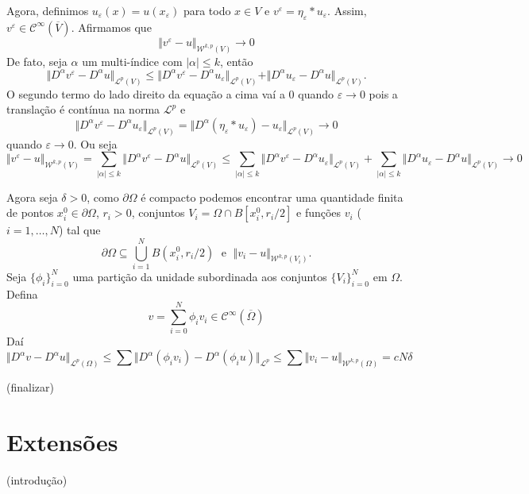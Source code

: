 \documentclass[a4paper, 11pt]{book}
\theoremstyle{definition}
\newcommand{\cC}{\mathcal{C}}
\newcommand{\cL}{\mathcal{L}}
\newcommand{\cW}{\mathcal{W}}
\begin{document}
\begin{prf}
    Agora, definimos $u_\varepsilon(x) = u(x_\varepsilon)$ para todo $x \in V$ e $v^\varepsilon = \eta_\varepsilon * u_\varepsilon$. Assim, $v^\varepsilon \in \cC^{\infty}(\overline V)$.
    Afirmamos que
    \[
        \Vert v^\varepsilon - u \Vert_{\cW^{k,p}(V)} \to 0
    \]
    De fato, seja $\alpha $ um multi-índice com $|\alpha| \leqslant k$, então
    \[
        \Vert D^\alpha v^\varepsilon - D^\alpha u \Vert_{\cL^p(V)} \leqslant \Vert D^\alpha v^\varepsilon - D^\alpha u_\varepsilon \Vert_{\cL^p(V)} + \Vert D^\alpha u_\varepsilon - D^\alpha u \Vert_{\cL^p(V)}.
    \]
    O segundo termo do lado direito da equação a cima vaí a $0$ quando $\varepsilon \to 0$ pois a translação é contínua na norma $\cL^p$ e
    \[
        \Vert D^\alpha v^\varepsilon - D^\alpha u_\varepsilon \Vert_{\cL^p(V)} = \Vert D^\alpha (\eta_\varepsilon * u_\varepsilon) - u_\varepsilon \Vert_{\cL^p(V)} \to 0
    \]
    quando $\varepsilon \to 0$. Ou seja
    \[
        \Vert v^\varepsilon - u \Vert_{\cW^{k,p}(V)} = \sum_{|\alpha| \leqslant k} \Vert D^\alpha v^\varepsilon - D^\alpha u \Vert_{\cL^p(V)} \leqslant \sum_{|\alpha| \leqslant k} \Vert D^\alpha v^\varepsilon - D^\alpha u_\varepsilon \Vert_{\cL^p(V)} + \sum_{|\alpha| \leqslant k} \Vert D^\alpha u_\varepsilon - D^\alpha u \Vert_{\cL^p(V)} \to 0
    \]

    Agora seja $\delta > 0$, como $\partial \Omega$ é compacto podemos encontrar uma quantidade finita de pontos $x^0_i \in \partial \Omega$, $r_i > 0$, conjuntos $V_i = \Omega \cap B[x^0_i,r_i / 2]$ e funções $v_i$ ($i = 1,\dots, N$) tal que
    \[
        \partial\Omega \subseteq \bigcup_{i=1}^N B(x_i^0, r_i/2) \;\text{ e }\; \Vert v_i - u \Vert_{\cW^{k,p}(V_i)}.
    \]
    Seja $\{\phi_i\}_{i=0}^N$ uma partição da unidade subordinada aos conjuntos $\{V_i\}_{i=0}^N$ em $\Omega$.
    Defina
    \[
        v = \sum_{i=0}^N \phi_i v_i \in \cC^{\infty}(\overline\Omega)
    \]
    Daí
    \[
        \Vert D^\alpha v - D^\alpha u \Vert_{\cL^p(\Omega)} \leqslant \sum \Vert D^\alpha (\phi_i v_i) - D^\alpha(\phi_i u) \Vert_{\cL^p} \leqslant \sum \Vert v_i - u \Vert_{\cW^{k,p}(\Omega)} = cN\delta
    \]

    (finalizar)
\end{prf}

\section{Extensões}

(introdução)
\end{document}
